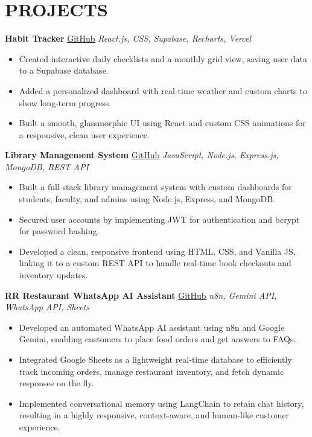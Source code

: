 \documentclass[letterpaper,11pt]{article}
\begin{document}
\section*{PROJECTS}

\noindent\textbf{Habit Tracker} \quad
\textcolor{blue}{\href{https://github.com/Rithwik007/habit-tracker-web2}{GitHub}} \hfill \textit{React.js, CSS, Supabase, Recharts, Vercel}

\begin{itemize}
\item Created interactive daily checklists and a monthly grid view, saving user data to a Supabase database.
\item Added a personalized dashboard with real-time weather and custom charts to show long-term progress.
\item Built a smooth, glassmorphic UI using React and custom CSS animations for a responsive, clean user experience.

\end{itemize}

\noindent\textbf{Library Management System} \quad
\textcolor{blue}{\href{https://github.com/Rithwik007/Library-Management}{GitHub}} \hfill \textit{JavaScript, Node.js, Express.js, MongoDB, REST API}

\begin{itemize}
\item Built a full-stack library management system with custom dashboards for students, faculty, and admins using Node.js, Express, and MongoDB.
\item Secured user accounts by implementing JWT for authentication and bcrypt for password hashing.
\item Developed a clean, responsive frontend using HTML, CSS, and Vanilla JS, linking it to a custom REST API to handle real-time book checkouts and inventory updates.

\end{itemize}

\noindent\textbf{RR Restaurant WhatsApp AI Assistant}  \quad
\textcolor{blue}{\href{https://github.com/Rithwik007/n8n_automation_usecase}{GitHub}} \hfill \textit{n8n, Gemini API, WhatsApp API, Sheets}


\begin{itemize}
\item Developed an automated WhatsApp AI assistant using n8n and Google Gemini, enabling customers to place food orders and get answers to FAQs.
\item Integrated Google Sheets as a lightweight real-time database to efficiently track incoming orders, manage restaurant inventory, and fetch dynamic responses on the fly.
\item Implemented conversational memory using LangChain to retain chat history, resulting in a highly responsive, context-aware, and human-like customer experience.

\end{itemize}
\end{document}
